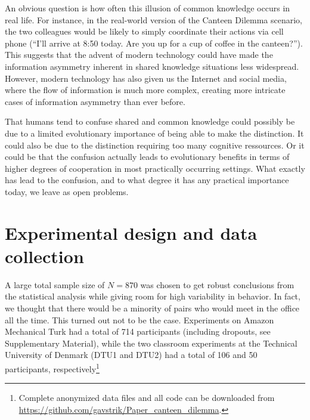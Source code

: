 \documentclass[twocolumn,a4paper,superscriptaddress,nofootinbib]{revtex4}
\newcommand{\tobo}[1]{{\color{red} TOBO: #1}}
\newcommand{\tsn}[1]{{\color{blue} TSN: #1}}
\begin{document}
An obvious question is how often this illusion of common knowledge occurs in real life. For instance, in the real-world version of the Canteen Dilemma scenario, the two colleagues would be likely to simply coordinate their actions via cell phone (``I'll arrive at 8:50 today. Are you up for a cup of coffee in the canteen?''). This suggests that the advent of modern technology could have made the information asymmetry inherent in shared knowledge situations less widespread. However, modern technology has also given us the Internet and social media, where the flow of information is much more complex, creating more intricate cases of information asymmetry than ever before. 

That humans tend to confuse shared and common knowledge could possibly be due to a limited evolutionary importance of being able to make the distinction. It could also be due to the distinction requiring too many cognitive ressources. Or it could be that the confusion actually leads to evolutionary benefits in terms of higher degrees of cooperation in most practically occurring settings. What exactly has lead to the confusion, and to what degree it has any practical importance today, we leave as open problems.

\if{}

\fi


\appendix



\section{Experimental design and data collection} A large total sample size of $N=870$ was chosen to get robust conclusions from the statistical analysis while giving room for high variability in behavior. In fact, we thought that there would be a minority of pairs who would meet in the office all the time. This turned out not to be the case. Experiments on Amazon Mechanical Turk had a total of 714 participants (including dropouts, see Supplementary Material), while the two classroom experiments at the Technical University of Denmark (DTU1 and DTU2) had a total of 106 and 50 participants, respectively\footnote{Complete anonymized data files and all code can be downloaded from \url{https://github.com/gavstrik/Paper_canteen_dilemma}.}
\end{document}
